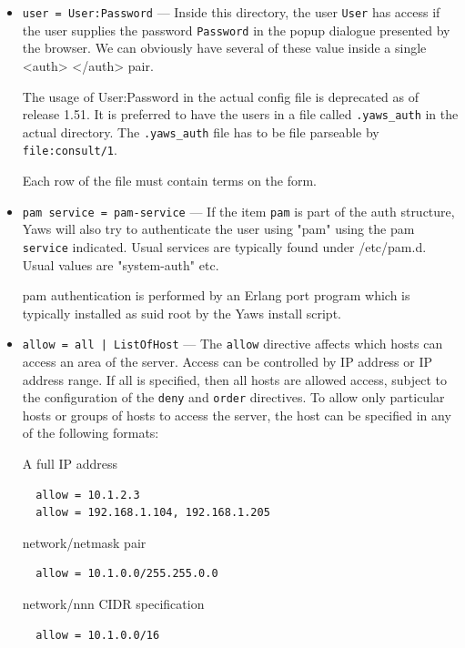 \documentclass[11pt,oneside,english]{book}
\begin{document}
\begin{itemize}
\begin{itemize}
              \item \verb+user = User:Password+ --- Inside this directory, the
                user \verb+User+ has access if the user supplies the password
                \verb+Password+ in the popup dialogue presented by the browser.
                We can obviously have several of these value inside a single
                <auth> </auth> pair.

                The usage of User:Password in the actual config file is
                deprecated as of release 1.51. It is preferred to have the users
                in a file called \verb+.yaws_auth+ in the actual directory. The
                \verb+.yaws_auth+ file has to be file parseable by
                \verb+file:consult/1+.

                Each row of the file must contain terms on the form.

              \item \verb+pam service = pam-service+ --- If the item \verb+pam+
                is part of the auth structure, Yaws will also try to
                authenticate the user using "pam" using the pam \verb+service+
                indicated. Usual services are typically found under
                /etc/pam.d. Usual values are "system-auth" etc.

                pam authentication is performed by an Erlang port program which
                is typically installed as suid root by the Yaws install script.

              \item \verb+allow = all | ListOfHost+ --- The \verb+allow+
                directive affects which hosts can access an area of the
                server. Access can be controlled by IP address or IP address
                range. If all is specified, then all hosts are allowed access,
                subject to the configuration of the \verb+deny+ and \verb+order+
                directives. To allow only particular hosts or groups of hosts to
                access the server, the host can be specified in any of the
                following formats:

                A full IP address
\begin{verbatim}
  allow = 10.1.2.3
  allow = 192.168.1.104, 192.168.1.205
\end{verbatim}
                network/netmask pair
\begin{verbatim}
  allow = 10.1.0.0/255.255.0.0
\end{verbatim}
                network/nnn CIDR specification
\begin{verbatim}
  allow = 10.1.0.0/16
\end{verbatim}


\end{itemize}
\end{itemize}
\end{document}
